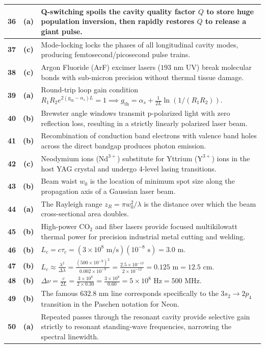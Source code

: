{\begin{tabularx}{\textwidth}{|c|c|X|}
\textbf{36} & \textbf{(a)} & Q-switching spoils the cavity quality factor $Q$ to store huge population inversion, then rapidly restores $Q$ to release a giant pulse. \\ \hline
\textbf{37} & \textbf{(c)} & Mode-locking locks the phases of all longitudinal cavity modes, producing femtosecond/picosecond pulse trains. \\ \hline
\textbf{38} & \textbf{(c)} & Argon Fluoride (ArF) excimer lasers ($193\text{ nm}$ UV) break molecular bonds with sub-micron precision without thermal tissue damage. \\ \hline
\textbf{39} & \textbf{(a)} & Round-trip loop gain condition $R_1 R_2 e^{2(g_{\text{th}} - \alpha_s)L} = 1 \implies g_{\text{th}} = \alpha_s + \frac{1}{2L}\ln(1/(R_1 R_2))$. \\ \hline
\textbf{40} & \textbf{(b)} & Brewster angle windows transmit p-polarized light with zero reflection loss, resulting in a strictly linearly polarized laser beam. \\ \hline
\textbf{41} & \textbf{(b)} & Recombination of conduction band electrons with valence band holes across the direct bandgap produces photon emission. \\ \hline
\textbf{42} & \textbf{(c)} & Neodymium ions ($\text{Nd}^{3+}$) substitute for Yttrium ($\text{Y}^{3+}$) ions in the host YAG crystal and undergo 4-level lasing transitions. \\ \hline
\textbf{43} & \textbf{(b)} & Beam waist $w_0$ is the location of minimum spot size along the propagation axis of a Gaussian laser beam. \\ \hline
\textbf{44} & \textbf{(a)} & The Rayleigh range $z_R = \pi w_0^2/\lambda$ is the distance over which the beam cross-sectional area doubles. \\ \hline
\textbf{45} & \textbf{(b)} & High-power $\text{CO}_2$ and fiber lasers provide focused multikilowatt thermal power for precision industrial metal cutting and welding. \\ \hline
\textbf{46} & \textbf{(b)} & $L_c = c \tau_c = (3 \times 10^8\text{ m/s})(10^{-8}\text{ s}) = 3.0\text{ m}$. \\ \hline
\textbf{47} & \textbf{(b)} & $L_c \approx \frac{\lambda^2}{\Delta\lambda} = \frac{(500 \times 10^{-9})^2}{0.002 \times 10^{-9}} = \frac{2.5 \times 10^{-13}}{2 \times 10^{-12}} = 0.125\text{ m} = 12.5\text{ cm}$. \\ \hline
\textbf{48} & \textbf{(b)} & $\Delta \nu = \frac{c}{2L} = \frac{3 \times 10^8}{2 \times 0.30} = \frac{3 \times 10^8}{0.60} = 5 \times 10^8\text{ Hz} = 500\text{ MHz}$. \\ \hline
\textbf{49} & \textbf{(b)} & The famous $632.8\text{ nm}$ line corresponds specifically to the $3s_2 \to 2p_4$ transition in the Paschen notation for Neon. \\ \hline
\textbf{50} & \textbf{(a)} & Repeated passes through the resonant cavity provide selective gain strictly to resonant standing-wave frequencies, narrowing the spectral linewidth. \\ \hline
\end{tabularx}
}

